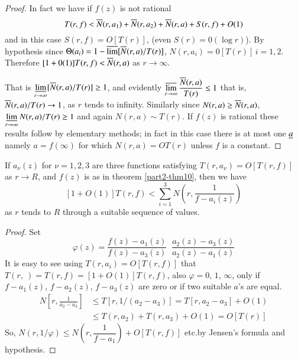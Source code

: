 \begin{proof}
In fact we have if $f(z)$ is not rational
$$
T(r,f)<\overline{N}(r,a_{1})+\overline{N}(r,a_{2})+\overline{N}(r,a)+S(r,f)+O(1)
$$
and in this case $S(r,f)=O[T(r)]$, (even $S(r)=0(\log r)$). By
hypothesis since $\Theta(a_{i})=1-\overline{\lim}[\overline{N}(r,a)/T(r)]$,
$N(r,a_{i})=0[T(r)]\,i=1,2$. Therefore $[1+0(1)]T(r,f)<\overline{N}(r,a)$
as $r\to \infty$.

That is $\mathop{\underline{\lim}}\limits_{r\to \infty}[\overline{N}(r,a)/T(r)]\geq
1$, and evidently $\mathop{\overline{\lim}}\limits_{r\to
  \infty}\dfrac{\overline{N}(r,a)}{T(r)}\leq 1$ that is,
$\overline{N}(r,a)/T(r)\to 1$, as $r$ tends to infinity. Similarly since
$N(r,a)\geq \overline{N}(r,a)$, $\mathop{\underline{\lim}}\limits_{r\to
  \infty}N(r,a)/T(r)\geq 1$ and again $N(r,a)\sim T(r)$. If $f(z)$ is
rational these results follow by elementary methods; in fact in this
case there is at most one $\underline{a}$ namely $a=f(\infty)$ for which
$N(r,a)=OT(r)$ unless $f$ is a constant.
\end{proof}

\begin{thm}\label{part2-thm12}
If $a_{\nu}(z)$ for $\nu=1,2,3$ are three functions satisfying\break
$T(r,a_{\nu}) =O[T(r,f)]$ as $r\to R$, and $f(z)$ is as in theorem
\ref{part2-thm10}, then we have
$$
[1+O(1)]T(r,f)<\sum^{3}_{i=1}N\left(r,\frac{1}{f-a_{i}(z)}\right)
$$
as $r$ tends to $R$ through a suitable sequence of values.
\end{thm}

\begin{proof}
Set\pageoriginale
$$
\varphi(z)=\frac{f(z)-a_{1}(z)}{f(z)-a_{3}(z)} \;\;
\frac{a_{2}(z)-a_{3}(z)}{a_{2}(z)-a_{1}(z)}  
$$
It is easy to see using $T(r,a_{i})=O[T(r,f)]$ that $T(r, \ )=T(r,
f)=[1+O(1)]T(r,f)$, also $\varphi=0$, $1$, $\infty$, only if
$f-a_{1}(z)$, $f-a_{2}(z)$, $f-a_{3}(z)$ are zero or if two suitable
$a$'s are equal.
\begin{align*}
N\left[r,\frac{1}{a_{2}-a_{3}}\right] &\leq
T[r,1/(a_{2}-a_{3})]=T[r,a_{2}-a_{3}]+O(1)\\
&\leq T(r,a_{2})+T(r,a_{3})+O(1)=O[T(r)]
\end{align*}
So, $N(r,1/\varphi)\leq N\left(r,\dfrac{1}{f-a_{1}}\right) +
O[T(r,f)]$ etc.\@ by Jensen's formula and hypothesis. 
\end{proof}

